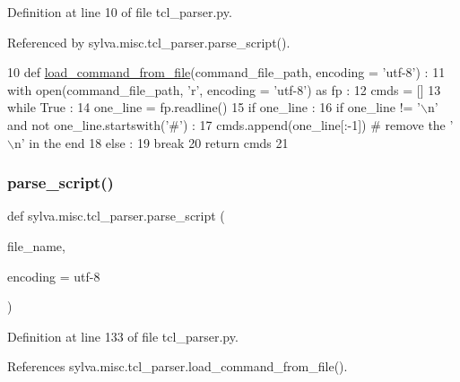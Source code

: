 Definition at line 10 of file tcl\+\_\+parser.\+py.



Referenced by sylva.\+misc.\+tcl\+\_\+parser.\+parse\+\_\+script().


\begin{DoxyCode}
10   \textcolor{keyword}{def }\hyperlink{namespacesylva_1_1misc_1_1tcl__parser_a3a51f30aa622037c144676d280943caa}{load\_command\_from\_file}(command\_file\_path, encoding = 'utf-8') :
11     with open(command\_file\_path, \textcolor{stringliteral}{'r', encoding = '}utf-8') as fp :
12       cmds = []
13       \textcolor{keywordflow}{while} \textcolor{keyword}{True} :
14         one\_line = fp.readline()
15         \textcolor{keywordflow}{if} one\_line :
16           \textcolor{keywordflow}{if} one\_line != \textcolor{stringliteral}{'\(\backslash\)n'} \textcolor{keywordflow}{and} \textcolor{keywordflow}{not} one\_line.startswith(\textcolor{stringliteral}{'#'}) :
17             cmds.append(one\_line[:-1]) \textcolor{comment}{# remove the '\(\backslash\)n' in the end}
18         \textcolor{keywordflow}{else} :
19           \textcolor{keywordflow}{break}
20     \textcolor{keywordflow}{return} cmds
21 
\end{DoxyCode}
\mbox{\label{namespacesylva_1_1misc_1_1tcl__parser_aab59812e931f24c8e7d1cbffd2fe587e}} 
\subsubsection{\texorpdfstring{parse\+\_\+script()}{parse\_script()}}
{\footnotesize\ttfamily def sylva.\+misc.\+tcl\+\_\+parser.\+parse\+\_\+script (\begin{DoxyParamCaption}\item[{}]{file\+\_\+name,  }\item[{}]{encoding = {\ttfamily \textquotesingle{}utf-\/8\textquotesingle{}} }\end{DoxyParamCaption})}



Definition at line 133 of file tcl\+\_\+parser.\+py.



References sylva.\+misc.\+tcl\+\_\+parser.\+load\+\_\+command\+\_\+from\+\_\+file().


